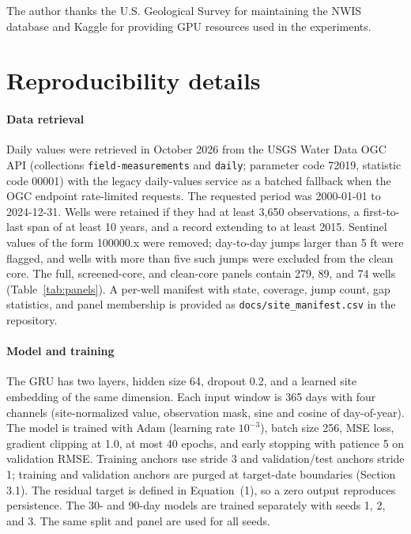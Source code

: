 \documentclass[preprint,12pt]{elsarticle}
\begin{document}
The author thanks the U.S. Geological Survey for maintaining the NWIS
database and Kaggle for providing GPU resources used in the experiments.

\appendix

\section{Reproducibility details}
\label{app:repro}

\paragraph{Data retrieval}
Daily values were retrieved in October 2026 from the USGS Water Data OGC API
(collections \texttt{field-measurements} and \texttt{daily}; parameter code
72019, statistic code 00001) with the legacy daily-values service as a batched
fallback when the OGC endpoint rate-limited requests. The requested period was
2000-01-01 to 2024-12-31. Wells were retained if they had at least 3{,}650
observations, a first-to-last span of at least 10 years, and a record extending
to at least 2015. Sentinel values of the form 100000.x were removed; day-to-day
jumps larger than 5 ft were flagged, and wells with more than five such jumps
were excluded from the clean core. The full, screened-core, and clean-core
panels contain 279, 89, and 74 wells (Table~\ref{tab:panels}). A per-well
manifest with state, coverage, jump count, gap statistics, and panel
membership is provided as \texttt{docs/site\_manifest.csv} in the repository.

\paragraph{Model and training}
The GRU has two layers, hidden size 64, dropout 0.2, and a learned site
embedding of the same dimension. Each input window is 365 days with four
channels (site-normalized value, observation mask, sine and cosine of
day-of-year). The model is trained with Adam (learning rate $10^{-3}$), batch
size 256, MSE loss, gradient clipping at 1.0, at most 40 epochs, and early
stopping with patience 5 on validation RMSE. Training anchors use stride 3 and
validation/test anchors stride 1; training and validation anchors are purged
at target-date boundaries (Section 3.1). The residual target is defined in
Equation~(1), so a zero output reproduces persistence. The 30- and 90-day
models are trained separately with seeds 1, 2, and 3. The same split and panel
are used for all seeds.
\end{document}
